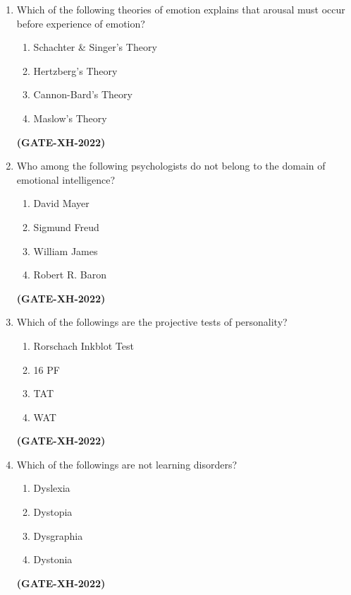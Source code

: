 \documentclass[journal]{IEEEtran}
\begin{document}
\begin{enumerate}
\item
Which of the following theories of emotion explains that arousal must occur before experience of emotion? 
\begin{multicols}{2}
\begin{enumerate}
\item Schachter \& Singer’s Theory  
\item Hertzberg’s Theory  
\item Cannon-Bard’s Theory 
\item Maslow’s Theory   
\end{enumerate}
\end{multicols}
\hfill\textbf{(GATE-XH-2022)}

\item
Who among the following psychologists do not belong to the domain of emotional intelligence? 
\begin{multicols}{4}
\begin{enumerate}
\item David Mayer 
\item Sigmund Freud 
\item William James 
\item Robert R. Baron 
\end{enumerate}
\end{multicols}
\hfill\textbf{(GATE-XH-2022)}

\item
Which of the followings are the projective tests of personality? 
\begin{multicols}{2}
\begin{enumerate}
\item Rorschach Inkblot Test 
\item 16 PF 
\item TAT 
\item WAT
\end{enumerate}
\end{multicols}
\hfill\textbf{(GATE-XH-2022)}

\item
Which of the followings are not learning disorders? 
\begin{multicols}{4}
\begin{enumerate}
\item Dyslexia 
\item Dystopia 
\item Dysgraphia 
\item Dystonia 
\end{enumerate}
\end{multicols}
\hfill\textbf{(GATE-XH-2022)}


\end{enumerate}
\end{document}
